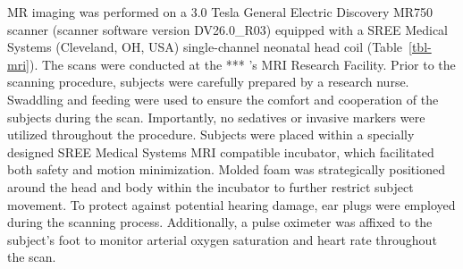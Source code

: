 \documentclass[
true
]{sn-jnl}
\begin{document}
MR imaging was performed on a 3.0 Tesla General Electric Discovery MR750
scanner (scanner software version DV26.0\_R03) equipped with a SREE
Medical Systems (Cleveland, OH, USA) single-channel neonatal head coil
(Table~\ref{tbl-mri}). The scans were conducted at the *** 's MRI
Research Facility. Prior to the scanning procedure, subjects were
carefully prepared by a research nurse. Swaddling and feeding were used
to ensure the comfort and cooperation of the subjects during the scan.
Importantly, no sedatives or invasive markers were utilized throughout
the procedure. Subjects were placed within a specially designed SREE
Medical Systems MRI compatible incubator, which facilitated both safety
and motion minimization. Molded foam was strategically positioned around
the head and body within the incubator to further restrict subject
movement. To protect against potential hearing damage, ear plugs were
employed during the scanning process. Additionally, a pulse oximeter was
affixed to the subject's foot to monitor arterial oxygen saturation and
heart rate throughout the scan.

\begingroup\fontsize{8}{10}\selectfont
\end{document}
